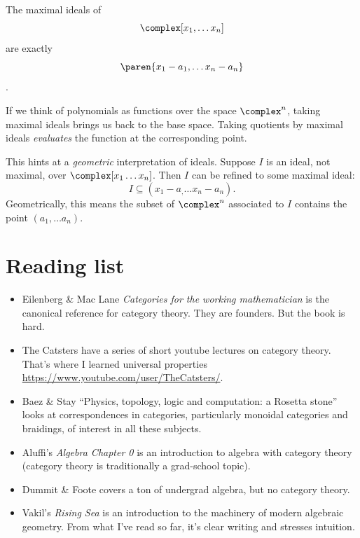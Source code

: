 \documentclass[a5paper]{scrartcl}
\def\book#1{\textit{#1}}
\begin{document}
\begin{theorem}
  The maximal ideals of
  \[
    \complex[x_1,\dots x_n]
  \]
  are exactly
  \[
    \paren{x_1-a_1,\dots x_n-a_n}
  \]
  \cite[107]{rising-sea2024}.
\end{theorem}
If we think of polynomials as functions over the space \(\complex^n\), taking maximal ideals brings us back to the base space. Taking quotients by maximal ideals \emph{evaluates} the function at the corresponding point.

This hints at a \emph{geometric} interpretation of ideals. Suppose \(I\) is an ideal, not maximal, over \(\complex[x_1\dots x_n]\). Then \(I\) can be refined to some maximal ideal:
\[
  I\subseteq (x_1-a_,\dots x_n-a_n).
\]
Geometrically, this means the subset of \(\complex^n\) associated to \(I\) contains the point \((a_1,\dots a_n)\).
\section{Reading list}
\begin{itemize}
  \item Eilenberg \& Mac Lane \book{Categories for the working mathematician} \cite{working} is the canonical reference for category theory. They are founders. But the book is hard.
  \item The Catsters have a series of short youtube lectures on category theory. That's where I learned universal properties \url{https://www.youtube.com/user/TheCatsters/}.
  \item Baez \& Stay ``Physics, topology, logic and computation: a Rosetta stone'' \cite{rosetta} looks at correspondences in categories, particularly monoidal categories and braidings, of interest in all these subjects.
  \item Aluffi's \book{Algebra Chapter 0} is an introduction to algebra with category theory (category theory is traditionally a grad-school topic).

  \item Dummit \& Foote \cite{dummit+foote} covers a ton of undergrad algebra, but no category theory.

  \item Vakil's \book{Rising Sea} is an introduction to the machinery of modern algebraic geometry. From what I've read so far, it's clear writing and stresses intuition.
\end{itemize}
\printbibliography
\end{document}
